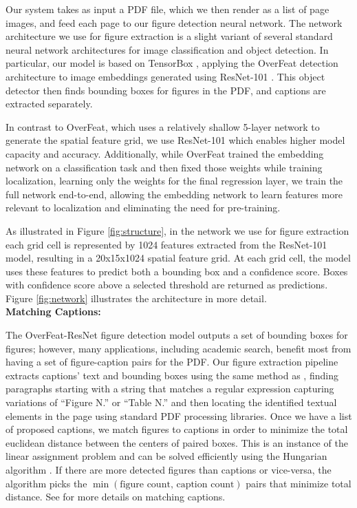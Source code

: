 \documentclass[sigconf]{acmart}
\begin{document}
Our system takes as input a PDF file, which we then render as a list of page images, and feed each page to our figure detection neural network. 
The network architecture we use for figure extraction is a slight variant of several standard neural network architectures for image classification and object detection. In particular, our model is based on TensorBox \cite{tensorbox}, applying the OverFeat detection architecture \cite{overfeat} to image embeddings generated using ResNet-101 \cite{resnet}. This object detector then finds bounding boxes for figures in the PDF, and captions are extracted separately. 

In contrast to OverFeat, which uses a relatively shallow 5-layer network to generate the spatial feature grid, we use ResNet-101 which enables higher model capacity and accuracy. Additionally, while OverFeat trained the embedding network on a classification task and then fixed those weights while training localization, learning only the weights for the final regression layer, we train the full network end-to-end, allowing the embedding network to learn features more relevant to localization and eliminating the need for pre-training. 

As illustrated in Figure \ref{fig:structure}, in the network we use for figure extraction each grid cell is represented by 1024 features extracted from the ResNet-101 model, resulting in a 20x15x1024 spatial feature grid. 
At each grid cell, the model uses these features to predict both a bounding box and a confidence score. Boxes with confidence score above a selected threshold are returned as predictions. Figure \ref{fig:network} illustrates the architecture in more detail.
\\[15pt]\textbf{Matching Captions:}

The OverFeat-ResNet figure detection model outputs a set of bounding boxes for figures; however, many applications, including academic search, benefit most from having a set of figure-caption pairs for the PDF. Our figure extraction pipeline extracts captions' text and bounding boxes using the same method as \cite{pdffigures2}, finding paragraphs starting with a string that matches a regular expression capturing variations of ``Figure N.'' or ``Table N.'' and then locating the identified textual elements in the page using standard PDF processing libraries. 
Once we have a list of proposed captions, we match figures to captions in order to minimize the total euclidean distance between the centers of paired boxes. 
This is an instance of the linear assignment problem and can be solved efficiently using the Hungarian algorithm \cite{kuhn1955hungarian}. 
If there are more detected figures than captions or vice-versa, the algorithm picks the $\min(\text{figure count, caption count})$ pairs that minimize total distance.
See \cite{pdffigures2} for more details on matching captions. 
\end{document}
